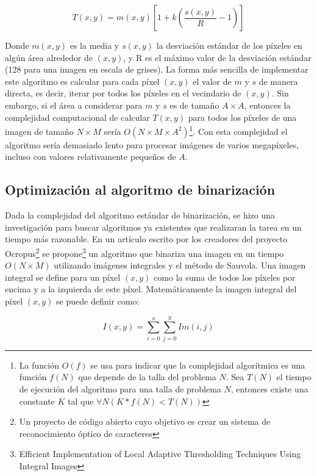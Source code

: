 \documentclass[a4paper, 11pt, oneside]{report}
\begin{document}
\begin{equation}\label{rSauvola}
	T(x,y)=m(x,y)\left[ 1 + k(\frac{s(x,y)}{R}-1) \right]
\end{equation}

Donde $m(x,y)$ es la media y $s(x,y)$ la desviación estándar de los píxeles en algún área alrededor de $(x,y)$, y R es el máximo valor de la desviación estándar (128 para una imagen en escala de grises). La forma más sencilla de implementar este algoritmo es calcular para cada píxel $(x,y)$ el valor de $m$ y $s$ de manera directa, es decir, iterar por todos los píxeles en el vecindario de $(x,y)$. Sin embargo, si el área a considerar para $m$ y $s$ es de tamaño $A \times A$, entonces la complejidad computacional de calcular $T(x,y)$ para todos los píxeles de una imagen de tamaño $N \times M$ sería $O(N \times M \times A^{2})$\footnote{La función $O(f)$ se usa para indicar que la complejidad algorítmica es una función $f(N)$ que depende de la talla del problema $N$. Sea $T(N)$ el tiempo de  ejecución del algoritmo para una talla de problema $N$, entonces existe una constante $K$ tal que  $\forall N ( K*f(N) < T(N) ) $}. Con esta complejidad el algoritmo sería demasiado lento para procesar imágenes de varios megapíxeles, incluso con valores relativamente pequeños de $A$.

\subsection{Optimización al algoritmo de binarización}

Dada la complejidad del algoritmo estándar de binarización, se hizo una investigación para buscar algoritmos ya existentes que realizaran la tarea en un tiempo más razonable. En un artículo escrito por los creadores del proyecto Ocropus\footnote{Un proyecto de código abierto cuyo objetivo es crear un sistema de reconocimiento óptico de caracteres} se propone\footnote{Efficient Implementation of Local Adaptive Thresholding Techniques Using Integral Images} un algoritmo que binariza una imagen en un tiempo $O(N \times M)$ utilizando imágenes integrales y el método de Sauvola. Una imagen integral se define para un píxel $(x, y)$ como la suma de todos los píxeles por encima y a la izquierda de este píxel. Matemáticamente la imagen integral del píxel $(x, y)$ se puede definir como:

\begin{equation}
	I(x, y) = \sum_{i=0}^{x}\sum_{j=0}^{y}Im(i, j)
\end{equation}
\end{document}
